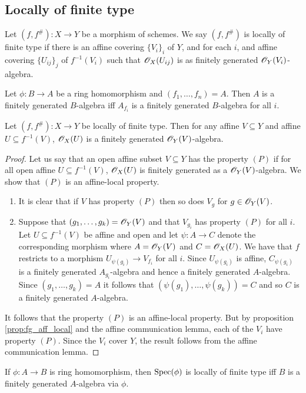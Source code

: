 \documentclass{memoir}
\begin{document}
\subsection{Locally of finite type}
\begin{definition}
    Let $(f,f^\#):X\to Y$ be a morphism of schemes.
    We say $(f,f^\#)$ is locally of finite type if there is an affine covering $\{V_i\}_i$ of $Y$, and for each $i$, and affine covering $\{U_{ij}\}_j$ of $f^{-1}(V_i)$ such that $\mathscr{O}_X(U_{ij})$ is as finitely generated $\mathscr{O}_Y(V_i)$-algebra.
\end{definition}
\begin{proposition}
    \label{prop:fg_aff_local}
    Let $\phi:B\to A$ be a ring homomorphism and $(f_1,\dots,f_n) = A$.
    Then $A$ is a finitely generated $B$-algebra iff $A_{f_i}$ is a finitely generated $B$-algebra for all $i$.
\end{proposition}
\begin{thm}
    Let $(f,f^\#):X\to Y$ be locally of finite type.
    Then for any affine $V\subseteq Y$ and affine $U\subseteq f^{-1}(V)$, $\mathscr{O}_X(U)$ is a finitely generated $\mathscr{O}_Y(V)$-algebra.
\end{thm}
\begin{proof}
    Let us say that an open affine subset $V\subseteq Y$ has the property $(P)$ if for all open affine $U\subseteq f^{-1}(V)$, $\mathscr{O}_X(U)$ is finitely generated as a $\mathscr{O}_Y(V)$-algebra.
    We show that $(P)$ is an affine-local property.
    \begin{enumerate}
        \item It is clear that if $V$ has property $(P)$ then so does $V_g$ for $g\in \mathscr{O}_Y(V)$.
        \item Suppose that $(g_1,\dots,g_k) = \mathscr{O}_Y(V)$ and that $V_{g_i}$ has property $(P)$ for all $i$.
    Let $U\subseteq f^{-1}(V)$ be affine and open and let $\psi:A\to C$ denote the corresponding morphism where $A = \mathscr{O}_Y(V)$ and $C = \mathscr{O}_X(U)$.
    We have that $f$ restricts to a morphism $U_{\psi(g_i)}\to V_{f_i}$ for all $i$.
    Since $U_{\psi(g_i)}$ is affine, $C_{\psi(g_i)}$ is a finitely generated $A_{g_i}$-algebra and hence a finitely generated $A$-algebra.
    Since $(g_1,\dots,g_k) = A$ it follows that $(\psi(g_1),\dots,\psi(g_k)) = C$ and so $C$ is a finitely generated $A$-algebra.
    \end{enumerate}
    It follows that the property $(P)$ is an affine-local property.
    But by proposition \ref{prop:fg_aff_local} and the affine communication lemma, each of the $V_i$ have property $(P)$.
    Since the $V_i$ cover $Y$, the result follows from the affine communication lemma.
\end{proof}
\begin{remark}
    If $\phi:A\to B$ is ring homomorphism, then $\operatorname{Spec}(\phi)$ is locally of finite type iff $B$ is a finitely generated $A$-algebra via $\phi$.
\end{remark}
\end{document}
